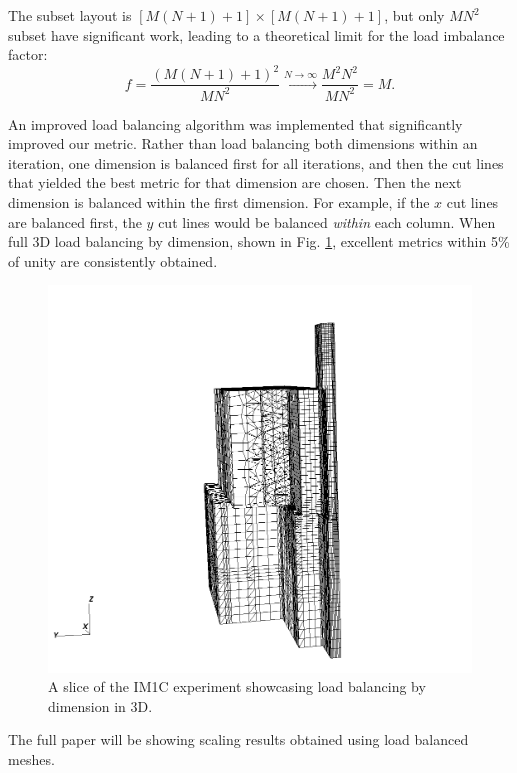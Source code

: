 \documentclass[letterpaper]{mandc2019}
\begin{document}
The subset layout is $[M(N+1)+1] \times [M(N+1)+1]$, but only $MN^2$ subset have significant work, leading to a theoretical limit for the load imbalance factor:
\begin{equation}
f= \frac{\left( M(N+1)+1 \right)^2}{MN^2} \xrightarrow{N\to \infty} \frac{M^2N^2}{MN^2} = M.
\end{equation}

An improved load balancing algorithm was implemented that significantly improved our metric. Rather than load balancing both dimensions within an iteration, one dimension is balanced first for all iterations, and then the cut lines that yielded the best metric for that dimension are chosen. Then the next dimension is balanced within the first dimension. For example, if the $x$ cut lines are balanced first, the $y$ cut lines would be balanced \textit{within} each column. When full 3D load balancing by dimension, shown in Fig. \ref{lbd}, excellent metrics within 5\% of unity are consistently obtained.

\begin{figure}[H]
\centering
\includegraphics[scale=0.5]{figures/im1_foam_448.png}
\caption{A slice of the IM1C experiment showcasing load balancing by dimension in 3D.}
\label{lbd}
\end{figure}

The full paper will be showing scaling results obtained using load balanced meshes.
\end{document}
